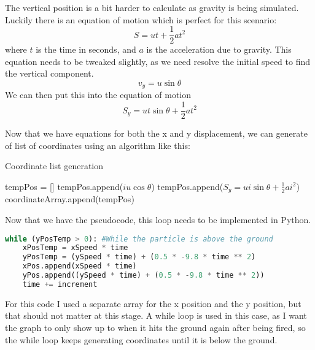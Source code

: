 The vertical position is a bit harder to calculate as gravity is being simulated. Luckily there is an equation of motion which is perfect for this scenario: \[S = ut + \frac{1}{2}at^2\] where $t$ is the time in seconds, and $a$ is the acceleration due to gravity. This equation needs to be tweaked slightly, as we need resolve the initial speed to find the vertical component. \[v_y = u\sin\theta\]
We can then put this into the equation of motion
\[S_y = ut\sin\theta  + \frac{1}{2}at^2\] 

Now that we have equations for both the x and y displacement, we can generate of list of coordinates using an algorithm like this:
\begin{algorithm}
	\caption{Coordinate list generation}
	\begin{algorithmic}[1]
			\State tempPos = []
			\State tempPos.append($iu\cos\theta$)
			\State tempPos.append($S_y = ui\sin\theta  + \frac{1}{2}ai^2$)
			\State coordinateArray.append(tempPos)
		\EndFor
	\end{algorithmic}
\end{algorithm}
Now that we have the pseudocode, this loop needs to be implemented in Python.
\begin{lstlisting}[language=Python, caption=Coordinate generation loop]
while (yPosTemp > 0): #While the particle is above the ground
	xPosTemp = xSpeed * time
	yPosTemp = (ySpeed * time) + (0.5 * -9.8 * time ** 2)
	xPos.append(xSpeed * time)
	yPos.append((ySpeed * time) + (0.5 * -9.8 * time ** 2))
	time += increment
\end{lstlisting} 
For this code I used a separate array for the x position and the y position, but that should not matter at this stage. A while loop is used in this case, as I want the graph to only show up to when it hits the ground again after being fired, so the while loop keeps generating coordinates until it is below the ground.

